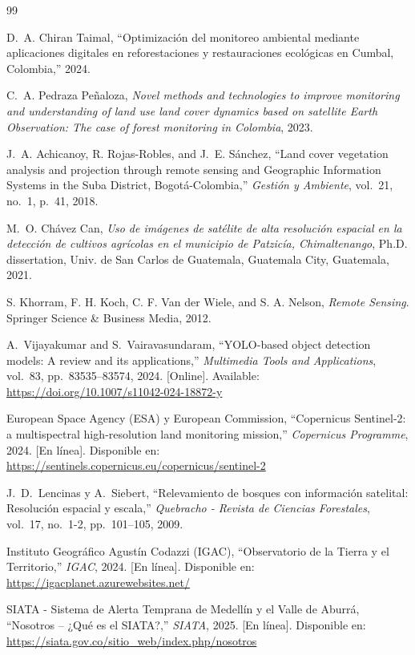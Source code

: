 \documentclass[10pt,a4paper,twocolumn,english]{article}
\begin{document}
\begin{thebibliography}{99}

D.~A. Chiran Taimal, ``Optimización del monitoreo ambiental mediante aplicaciones digitales en reforestaciones y restauraciones ecológicas en Cumbal, Colombia,'' 2024.


C.~A. Pedraza Peñaloza, \textit{Novel methods and technologies to improve monitoring and understanding of land use land cover dynamics based on satellite Earth Observation: The case of forest monitoring in Colombia}, 2023.

J.~A. Achicanoy, R. Rojas-Robles, and J.~E. Sánchez, ``Land cover vegetation analysis and projection through remote sensing and Geographic Information Systems in the Suba District, Bogotá-Colombia,'' \textit{Gestión y Ambiente}, vol.~21, no.~1, p.~41, 2018.

M.~O. Chávez Can, \textit{Uso de imágenes de satélite de alta resolución espacial en la detección de cultivos agrícolas en el municipio de Patzicía, Chimaltenango}, Ph.D. dissertation, Univ. de San Carlos de Guatemala, Guatemala City, Guatemala, 2021.


S. Khorram, F. H. Koch, C. F. Van der Wiele, and S. A. Nelson, 
\textit{Remote Sensing}. Springer Science \& Business Media, 2012.

A.~Vijayakumar and S.~Vairavasundaram, 
``YOLO-based object detection models: A review and its applications,'' 
\textit{Multimedia Tools and Applications}, vol.~83, pp.~83535--83574, 2024. [Online]. Available: \url{https://doi.org/10.1007/s11042-024-18872-y}

European Space Agency (ESA) y European Commission,
``Copernicus Sentinel‑2: a multispectral high‑resolution land monitoring mission,'' 
\textit{Copernicus Programme}, 2024. [En línea]. Disponible en: \url{https://sentinels.copernicus.eu/copernicus/sentinel-2}

J.~D.~Lencinas y A.~Siebert, 
``Relevamiento de bosques con información satelital: Resolución espacial y escala,'' 
\textit{Quebracho - Revista de Ciencias Forestales}, vol.~17, no.~1-2, pp.~101--105, 2009.


Instituto Geográfico Agustín Codazzi (IGAC), 
``Observatorio de la Tierra y el Territorio,'' 
\textit{IGAC}, 2024. [En línea]. Disponible en: \url{https://igacplanet.azurewebsites.net/}



SIATA - Sistema de Alerta Temprana de Medellín y el Valle de Aburrá, 
``Nosotros – ¿Qué es el SIATA?,'' 
\textit{SIATA}, 2025. [En línea]. Disponible en: \url{https://siata.gov.co/sitio_web/index.php/nosotros}



\end{thebibliography}
\end{document}
